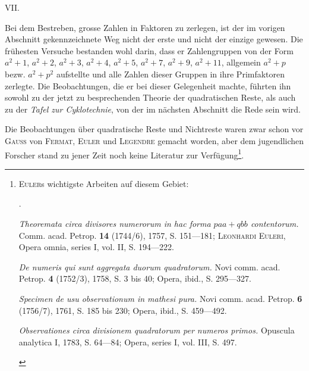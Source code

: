 \clearpage\begingroup{}
\renewcommand{\thefootnote}{\arabic{footnote})}\setcounter{footnote}{0}
\begin{center}VII.\\[3pt]{\large{}}\end{center}
\noindent\hspace*{\parindent}Bei dem Bestreben, grosse Zahlen in Faktoren zu zerlegen, ist der im
vorigen Abschnitt gekennzeichnete Weg nicht der erste und nicht der einzige
gewesen. Die frühesten Versuche bestanden wohl darin, dass er Zahlengruppen
von der Form $a^2+1$, $a^2+2$, $a^2+3$, $a^2+4$, $a^2+5$, $a^2+7$, $a^2+9$, $a^2+11$,
allgemein $a^2+p$ bezw. $a^2+p^2$ aufstellte und alle Zahlen dieser Gruppen in
ihre Primfaktoren zerlegte. Die Beobachtungen, die er bei dieser Gelegenheit machte, führten ihn sowohl zu der jetzt zu besprechenden Theorie der
quadratischen Reste, als auch zu der \textit{Tafel zur Cyklotechnie}, von der im
nächsten Abschnitt die Rede sein wird.

Die Beobachtungen über quadratische Reste und Nichtreste waren zwar
schon vor \textsc{Gauss} von \textsc{Fermat}, \textsc{Euler} und \textsc{Legendre} gemacht worden, aber
dem jugendlichen Forscher stand zu jener Zeit noch keine Literatur zur Verfügung\footnote{\textsc{Euler}s wichtigste Arbeiten auf diesem Gebiet:
\begin{list}{.}{\setlength{\leftmargin}{1.5em}\setlength{\itemsep}{0pt}\setlength{\topsep}{1pt}}
\item \textit{Theoremata circa divisores numerorum in hac forma $paa+qbb$ contentorum.} Comm. acad. Petrop. \textbf{14} (1744/6), 1757, S. 151—181; \textsc{Leonhardi Euleri}, Opera omnia, series I, vol. II, S. 194—222.
\item \textit{De numeris qui sunt aggregata duorum quadratorum.} Novi comm. acad. Petrop. \textbf{4} (1752/3), 1758, S. 3 bis 40; Opera, ibid., S. 295—327.
\item \textit{Specimen de usu observationum in mathesi pura.} Novi comm. acad. Petrop. \textbf{6} (1756/7), 1761, S. 185 bis 230; Opera, ibid., S. 459—492.
\item \textit{Observationes circa divisionem quadratorum per numeros primos.} Opuscula analytica I, 1783, S. 64—84; Opera, series I, vol. III, S. 497.
\end{list}}.

